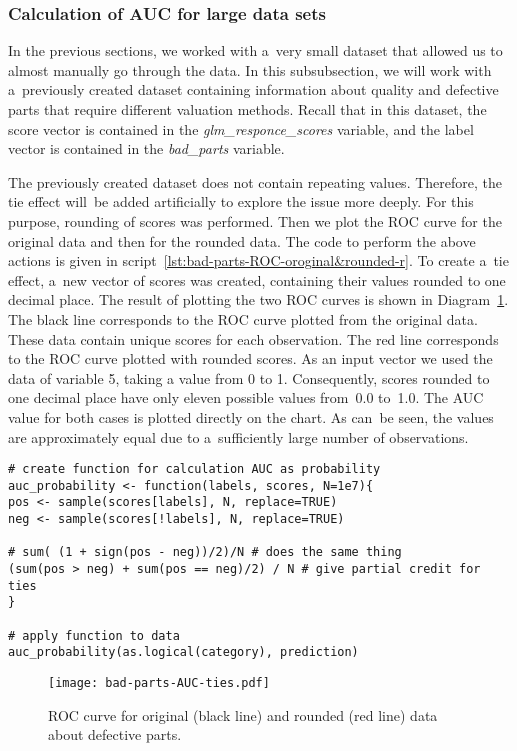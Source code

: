 \documentclass[]{scrreprt}
\begin{document}
\subsubsection{Calculation of AUC for large data sets}
In the previous sections, we worked with a~very small dataset that allowed us to almost manually go through the data. In this subsubsection, we will work with a~previously created dataset containing information about quality and defective parts that require different valuation methods. Recall that in this dataset, the score vector is contained in the \textit{glm\_responce\_scores} variable, and the label vector is contained in the \textit{bad\_parts} variable.

The previously created dataset does not contain repeating values. Therefore, the tie effect will~be added artificially to explore the issue more deeply. For this purpose, rounding of scores was performed. Then we plot the ROC curve for the original data and then for the rounded data. The code to perform the above actions is given in script~\ref{lst:bad-parts-ROC-oroginal&rounded-r}. To create a~tie effect, a~new vector of scores was created, containing their values rounded to one decimal place. The result of plotting the two ROC curves is shown in Diagram~\ref{fig:bad-parts-ROC-original&rounded-r}. The black line corresponds to the ROC curve plotted from the original data. These data contain unique scores for each observation. The red line corresponds to the ROC curve plotted with rounded scores. As an input vector we used the data of variable 5, taking a value from 0 to 1. Consequently, scores rounded to one decimal place have only eleven possible values from~0.0 to~1.0. The AUC value for both cases is plotted directly on the chart. As can~be seen, the values are approximately equal due to a~sufficiently large number of observations.
%
\begin{lstlisting}[float=htp, caption = Plotting the ROC curve on the original (black line) and rounded (red line) defective parts data, firstnumber=1, label= lst:bad-parts-ROC-oroginal&rounded-r]
# create function for calculation AUC as probability
auc_probability <- function(labels, scores, N=1e7){
pos <- sample(scores[labels], N, replace=TRUE)
neg <- sample(scores[!labels], N, replace=TRUE)

# sum( (1 + sign(pos - neg))/2)/N # does the same thing
(sum(pos > neg) + sum(pos == neg)/2) / N # give partial credit for ties
}

# apply function to data
auc_probability(as.logical(category), prediction)
\end{lstlisting}
%
\begin{figure}[htp]
	\centering
	\texttt{[image: bad-parts-AUC-ties.pdf]}
	\caption{ROC curve for original (black line) and rounded (red line) data about defective parts.}
	\label{fig:bad-parts-ROC-original&rounded-r}
\end{figure}
%
\end{document}
